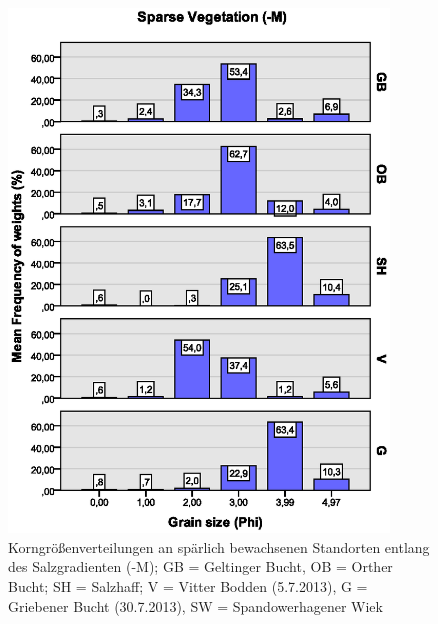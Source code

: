 \begin{figure}[!htb]
\centering
\includegraphics[trim = 0mm 35mm 0mm 0mm, clip, width=0.90\textwidth]{images/grainsize/korngroessenverteilungen_sg2.eps}
\caption[Korngrößenverteilungen entlang des Salzgradienten (-M)]{Korngrößenverteilungen an spärlich bewachsenen Standorten entlang des Salzgradienten (-M); GB = Geltinger Bucht, OB = Orther Bucht; SH = Salzhaff; V = Vitter Bodden (5.7.2013), G = Griebener Bucht (30.7.2013), SW = Spandowerhagener Wiek}
\label{fig:korngrössen_salzgradient_-m}
\end{figure}

